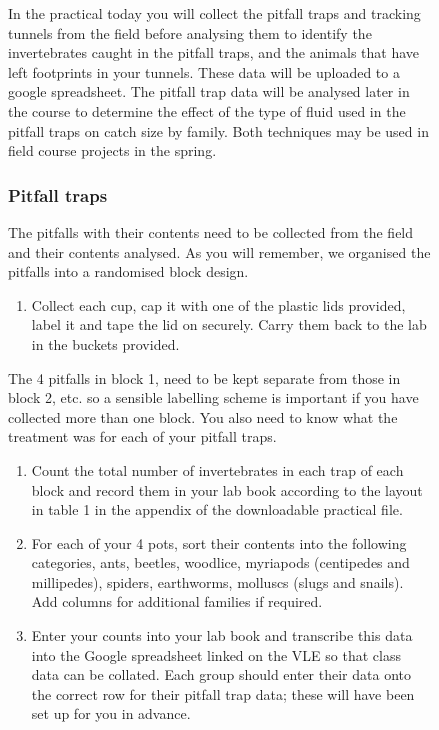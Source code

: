 \documentclass[
  letterpaper,
  DIV=11,
  numbers=noendperiod]{scrreprt}
\providecommand{\tightlist}{%
  \setlength{\itemsep}{0pt}\setlength{\parskip}{0pt}}
\begin{document}
\begin{figure}
{In the practical today you will collect the pitfall traps and tracking
tunnels from the field before analysing them to identify the
invertebrates caught in the pitfall traps, and the animals that have
left footprints in your tunnels. These data will be uploaded to a google
spreadsheet. The pitfall trap data will be analysed later in the course
to determine the effect of the type of fluid used in the pitfall traps
on catch size by family. Both techniques may be used in field course
projects in the spring.

\subsubsection{Pitfall traps}\label{pitfall-traps}

The pitfalls with their contents need to be collected from the field and
their contents analysed. As you will remember, we organised the pitfalls
into a randomised block design.

\begin{enumerate}
\def\labelenumi{\arabic{enumi}.}
\tightlist
\item
  Collect each cup, cap it with one of the plastic lids provided, label
  it and tape the lid on securely. Carry them back to the lab in the
  buckets provided.
\end{enumerate}

The 4 pitfalls in block 1, need to be kept separate from those in block
2, etc. so a sensible labelling scheme is important if you have
collected more than one block. You also need to know what the treatment
was for each of your pitfall traps.

\begin{enumerate}
\def\labelenumi{\arabic{enumi}.}
\setcounter{enumi}{1}
\item
  Count the total number of invertebrates in each trap of each block and
  record them in your lab book according to the layout in table 1 in the
  appendix of the downloadable practical file.
\item
  For each of your 4 pots, sort their contents into the following
  categories, ants, beetles, woodlice, myriapods (centipedes and
  millipedes), spiders, earthworms, molluscs (slugs and snails). Add
  columns for additional families if required.
\item
  Enter your counts into your lab book and transcribe this data into the
  Google spreadsheet linked on the VLE so that class data can be
  collated. Each group should enter their data onto the correct row for
  their pitfall trap data; these will have been set up for you in
  advance.
\end{enumerate}

}
\end{figure}
\end{document}
